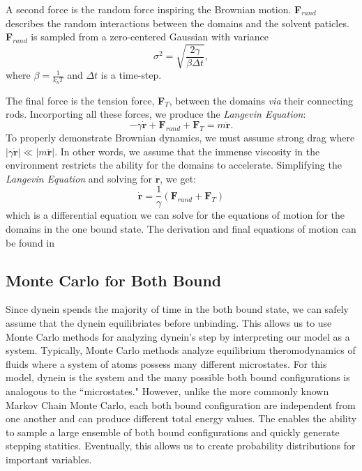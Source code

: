 A second force is the random force inspiring the Brownian motion. \textbf{F}$_{rand}$ describes the random interactions between the domains and the solvent paticles. \textbf{F}$_{rand}$ is sampled from a zero-centered Gaussian with variance
\begin{equation}
	\sigma^2=\sqrt{\frac{2\gamma}{\beta\Delta t}},
\end{equation}
where $\beta=\frac{1}{k_bT}$  and $\Delta t$ is a time-step. 

The final force is the tension force, \textbf{F}$_T$, between the domains \textit{via} their connecting rods. Incorporting all these forces, we produce the \textit{Langevin Equation}:
\begin{equation}
	-\gamma \dot{\textbf{r}} + \textbf{F}_{rand} + \textbf{F}_T = m\ddot{\textbf{r}}.
\end{equation}
To properly demonstrate Brownian dynamics, we must assume strong drag where $|\gamma \dot{\textbf{r}}|\ll |m\ddot{\textbf{r}}|$. In other words, we assume that the immense viscosity in the environment restricts the ability for the domains to accelerate. Simplifying the \textit{Langevin Equation} and solving for $\dot{\textbf{r}}$, we get:
\begin{equation}
	\dot{\textbf{r}}=\frac{1}{\gamma}(\textbf{F}_{rand} + \textbf{F}_T)
\end{equation}
which is a differential equation we can solve for the equations of motion for the domains in the one bound state. The derivation and final equations of motion can be found in \cite{Capek2017, W}


\subsection{Monte Carlo for Both Bound}
Since dynein spends the majority of time in the both bound state, we can safely assume that the dynein equilibriates before unbinding. This allows us to use Monte Carlo methods for analyzing dynein's step by interpreting our model as a system. Typically, Monte Carlo methods analyze equilibrium theromodynamics of fluids where a system of atoms possess many different microstates. For this model, dynein is the system and the many possible both bound configurations is analogous to the ``microstates." However, unlike the more commonly known Markov Chain Monte Carlo, each both bound configuration are independent from one another and can produce different total energy values. The enables the ability to sample a large ensemble of both bound configurations and quickly generate stepping statitics. Eventually, this allows us to create probability distributions for important variables.

